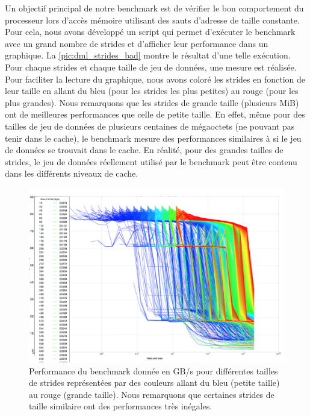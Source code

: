         Un objectif principal de notre benchmark est de vérifier le bon comportement du processeur lors d'accès mémoire utilisant des sauts d'adresse de taille constante. Pour cela, nous avons développé un script qui permet d'exécuter le benchmark avec un grand nombre de strides et d'afficher leur performance dans un graphique. La \autoref{pic:dml_strides_bad} montre le résultat d'une telle exécution. Pour chaque \glspl{stride} et chaque taille de jeu de données, une mesure est réalisée. Pour faciliter la lecture du graphique, nous avons coloré les strides en fonction de leur taille en allant du bleu (pour les strides les plus petites) au rouge (pour les plus grandes). Nous remarquons que les strides de grande taille (plusieurs MiB) ont de meilleures performances que celle de petite taille. En effet, même pour des tailles de jeu de données de plusieurs centaines de mégaoctets (ne pouvant pas tenir dans le cache), le benchmark mesure des performances similaires à si le jeu de données se trouvait dans le cache. En réalité, pour des grandes tailles de strides, le jeu de données réellement utilisé par le benchmark peut être contenu dans les différents niveaux de cache. 
      
        \begin{figure}
        \center
        \includegraphics[width=12cm]{images/dml_strides_bad.png}
        \caption{\label{pic:dml_strides_bad} Performance du benchmark donnée en GB/s pour différentes tailles de strides représentées par des couleurs allant du bleu (petite taille) au rouge (grande taille). Nous remarquons que certaines strides de taille similaire ont des performances très inégales.}
        \end{figure}
        
